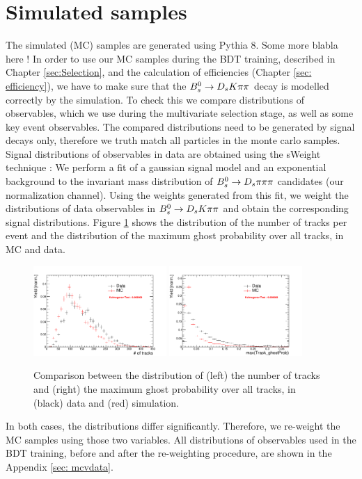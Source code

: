 \section{Simulated samples}

The simulated (MC) samples are generated using Pythia 8. Some more blabla here ! \newline
In order to use our MC samples during the BDT training, described in Chapter \ref{sec:Selection}, and the calculation of efficiencies (Chapter \ref{sec: efficiency}), 
we have to make sure that the ${{B}^0_{s}}\rightarrow{\ensuremath{{D}_{s}}}{\ensuremath{K}}{\ensuremath{\pi}}{\ensuremath{\pi}}$ decay is modelled correctly by the simulation. 
To check this we compare distributions of observables, which we use during the multivariate selection stage, as well as some key event observables. 
The compared distributions need to be generated by signal decays only, therefore we truth match all particles in the monte carlo samples. 
Signal distributions of observables in data are obtained using the sWeight technique \cite{Pivk:2004ty}: 
We perform a fit of a gaussian signal model and an exponential background to the invariant mass distribution of ${{B}^0_{s}}\rightarrow{\ensuremath{{D}_{s}}}{\ensuremath{\pi}}{\ensuremath{\pi}}{\ensuremath{\pi}}$ candidates (our normalization channel). 
Using the weights generated from this fit, we weight the distributions of data observables in ${{B}^0_{s}}\rightarrow{\ensuremath{{D}_{s}}}{\ensuremath{K}}{\ensuremath{\pi}}{\ensuremath{\pi}}$ and obtain the corresponding signal distributions. \newline
Figure \ref{fig: MCbeforeWeighting} shows the distribution of the number of tracks per event and the distribution of the maximum ghost probability over all tracks, in MC and data.

\begin{figure}[h]
\includegraphics[height=6.cm,width=0.45\textwidth]{figs/nTracks.pdf}
\includegraphics[height=6.cm,width=0.45\textwidth]{figs/max_ghostProb.pdf}
\caption{Comparison between the distribution of (left) the number of tracks and (right) the maximum ghost probability over all tracks, in (black) data and (red) simulation.}
\label{fig: MCbeforeWeighting}
\end{figure}


In both cases, the distributions differ significantly. Therefore, we re-weight the MC samples using those two variables. 
All distributions of observables used in the BDT training, before and after the re-weighting procedure, are shown in the Appendix \ref{sec: mcvdata}.                 
